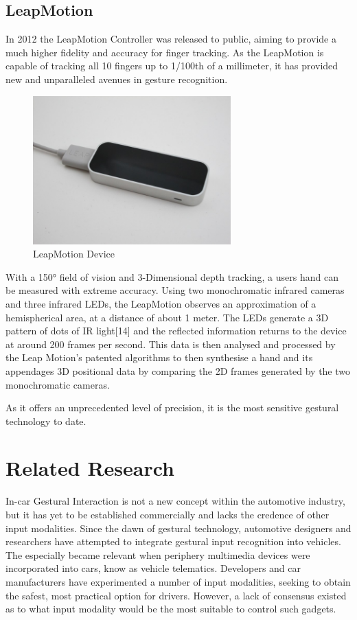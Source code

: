 \documentclass{l4proj}
\begin{document}
\subsection{LeapMotion}
\vspace{-3mm}
In 2012 the LeapMotion Controller was released to public, aiming to provide a much higher fidelity and accuracy for finger tracking. As the LeapMotion is capable of tracking all 10 fingers up to 1/100th of a millimeter, it has provided new and unparalleled avenues in gesture recognition.
\begin{figure}[h!]
\centering
\includegraphics[width=3in]{images/leap.png}
\caption{LeapMotion Device}
\label{fig:leap}
\end{figure}

With a 150° field of vision and 3-Dimensional depth tracking, a users hand can be measured with extreme accuracy. Using two monochromatic infrared cameras and three infrared LEDs, the LeapMotion observes an approximation of a hemispherical area, at a distance of about 1 meter. The LEDs generate a 3D pattern of dots of IR light[14] and the reflected information returns to the device at around 200 frames per second. This data is then analysed and processed by the Leap Motion's patented algorithms to then synthesise a hand and its appendages 3D positional data by comparing the 2D frames generated by the two monochromatic cameras.

As it offers an unprecedented level of precision, it is the most sensitive gestural technology to date.

\section{Related Research}
\vspace{-3mm}
In-car Gestural Interaction is not a new concept within the automotive industry, but it has yet to be established commercially and lacks the credence of other input modalities. Since the dawn of gestural technology, automotive designers and researchers have attempted to integrate gestural input recognition into vehicles. The especially became relevant when periphery multimedia devices were incorporated into cars, know as vehicle telematics. Developers and car manufacturers have experimented a number of input modalities, seeking to obtain the safest, most practical option for drivers. However, a lack of consensus existed as to what input modality would be the most suitable to control such gadgets. 
\end{document}
